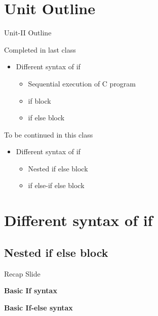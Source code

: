 \documentclass[10pt,a4paper]{beamer}
\begin{document}
\section{Unit Outline}
    \begin{frame}{Unit-II Outline}
    
    \begin{block}{Completed in last class}
        \begin{itemize}
        \item Different syntax of if 
                    \begin{itemize}
                            \item  Sequential execution of C program
                             \item if block
                                \item if else block
                    \end{itemize}
        \end{itemize}
    \end{block}
       
    \begin{exampleblock}{To be continued in this class}
            \begin{itemize}
        \item Different syntax of if 
                    \begin{itemize}
                        \item Nested if else block
                        \item if else-if else block
                    \end{itemize}
        \end{itemize}
    \end{exampleblock}
          
            
    \end{frame}

\section{Different syntax of if }

    \subsection{Nested if else block}
    
    \begin{frame}{Recap Slide}
        \begin{minipage}{0.5\linewidth}
        \textbf{ Basic If syntax}
             
        \end{minipage}%
        \begin{minipage}{0.5 \linewidth}
        \textbf{ Basic If-else syntax}
             
        \end{minipage}
    \end{frame}
    
\end{document}

